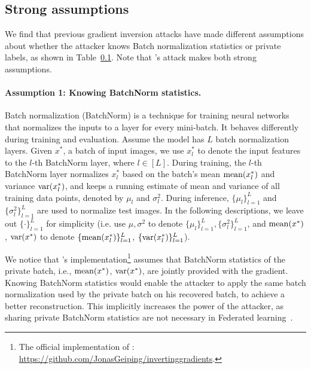 \subsection{Strong assumptions} 
\label{sec:assumption_explain}


We find that previous gradient inversion attacks have made different assumptions about whether the attacker knows Batch normalization statistics or private labels, as shown in  Table~\ref{sec:assumption_explain}. 
Note that \citep{geiping2020inverting}'s attack makes both strong assumptions.


\paragraph{Assumption 1: Knowing BatchNorm statistics.} Batch normalization (BatchNorm) \citep{ioffe2015batch} is a technique for training neural networks that normalizes the inputs to a layer for every mini-batch. It behaves differently during training and evaluation. Assume the model has $L$ batch normalization layers. Given $x^*$, a batch of input images, we use $x^*_l$ to denote the input features to the $l$-th BatchNorm layer, where $l \in [L]$. During training, the $l$-th BatchNorm layer normalizes $x^*_l$ based on the batch's mean ${\rm mean}(x^*_l)$ and variance ${\rm var}(x^*_l)$, and keeps a running estimate of mean and variance of all training data points, denoted by $\mu_l$ and $\sigma^2_l$. 
During inference, $\{\mu_l\}_{l=1}^L$ and $\{\sigma^2_l\}_{l=1}^L$ are used to normalize test images. In the following descriptions, we leave out $\{\cdot\}_{l=1}^L$ for simplicity (i.e. use $\mu, \sigma^2$ to denote $\{\mu_l\}_{l=1}^L, \{\sigma^2_l\}_{l=1}^L$, and ${\rm mean}(x^*)$, ${\rm var}(x^*)$ to denote $\{{\rm mean}(x^*_l)\}_{l=1}^L$, $\{{\rm var}(x^*_l)\}_{l=1}^L$).

We notice that \citep{geiping2020inverting}'s implementation\footnote{The official implementation of \citep{geiping2020inverting}: \href{https://github.com/JonasGeiping/invertinggradients}{https://github.com/JonasGeiping/invertinggradients}.} assumes that BatchNorm statistics of the  private batch, i.e., ${\rm mean}(x^*)$, ${\rm var}(x^*)$, are jointly provided with the gradient. Knowing BatchNorm statistics would enable the  attacker to apply the same batch normalization used by the private batch on his recovered batch, to achieve a better reconstruction.  This implicitly increases the power of the attacker, as sharing private BatchNorm statistics are not necessary in Federated learning~\citep{andreux2020siloed, li2021fedbn}.


